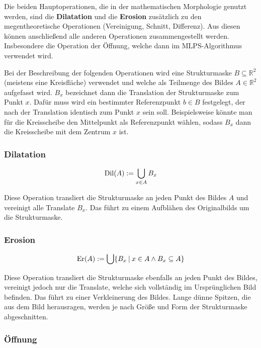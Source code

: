 \documentclass{article}
\newcommand{\R}[0]{\mathbb{R}}
\begin{document}
Die beiden Hauptoperationen, die in der mathematischen Morphologie genutzt werden, sind die \textbf{Dilatation} und die \textbf{Erosion} zusätzlich zu den megentheoretische Operationen (Vereinigung, Schnitt, Differenz).
Aus diesen können anschließend alle anderen Operationen zusammengestellt werden. Insbesondere die Operation der Öffnung, welche dann im MLPS-Algorithmus verwendet wird.


Bei der Beschreibung der folgenden Operationen wird eine Strukturmaske $B \subseteq \R^2$ (meistens eine Kreisfläche) verwendet und welche als Teilmenge des Bildes $A \in \R^2$ aufgefasst wird.
$B_x$ bezeichnet dann die Translation der Strukturmaske zum Punkt $x$. Dafür muss wird ein bestimmter Referenzpunkt $b \in B$ festgelegt, der nach der Translation identisch zum Punkt $x$ sein soll.
Beispielsweise könnte man für die Kreisscheibe den Mittelpunkt als Referenzpunkt wählen, sodass $B_x$ dann die Kreisscheibe mit dem Zentrum $x$ ist.

\subsubsection{Dilatation}
\begin{equation}
    {\rm Dil}(A) := \bigcup\limits_{x \in A} B_x
\end{equation}

Diese Operation transliert die Strukturmaske an jeden Punkt des Bildes $A$ und vereinigt alle Translate $B_x$. Das führt zu einem Aufblähen des Originalbilds um die Strukturmaske.

\subsubsection{Erosion}
\begin{equation}
    {\rm Er}(A) := \bigcup \{B_x \: | \: x \in A \land B_x \subseteq A\}
\end{equation}

Diese Operation transliert die Strukturmaske ebenfalls an jeden Punkt des Bildes, vereinigt jedoch nur die Translate, welche sich vollständig im Ursprünglichen Bild befinden.
Das führt zu einer Verkleinerung des Bildes. Lange dünne Spitzen, die aus dem Bild herausragen, werden je nach Größe und Form der Strukturmaske abgeschnitten.

\subsubsection{Öffnung}
\end{document}
